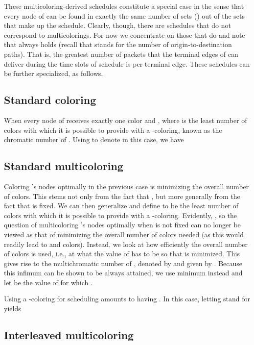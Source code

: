 \documentclass{article}
\begin{document}
These multicoloring-derived schedules constitute a special case in the sense
that every node of  can be found in exactly the same number of sets () out
of the  sets that make up the schedule. Clearly, though, there are schedules
that do not correspond to multicolorings. For now we concentrate on those that
do and note that  always holds (recall
that  stands for the number of origin-to-destination paths). That is,
the greatest number of packets that the  terminal edges of  can deliver
during the  time slots of schedule  is  per terminal edge.
These schedules can be further specialized, as follows.

\subsection{Standard coloring}

When  every node of  receives exactly one color and
, where  is the least number
of colors with which it is possible to provide  with a -coloring, known as
the chromatic number of . Using  to denote 
in this case, we have


\subsection{Standard multicoloring}

Coloring 's nodes optimally in the previous case is minimizing the overall
number of colors. This stems not only from the fact that , but more
generally from the fact that  is fixed. We can then generalize and define
 to be the least number of colors with which it is possible to
provide  with a -coloring. Evidently,
, so the question of multicoloring 's
nodes optimally when  is not fixed can no longer be viewed as that of
minimizing the overall number of colors needed (as this would readily lead to
 and  colors). Instead, we look at how efficiently the overall
number of colors is used, i.e., at what the value of  has to be so that
 is minimized. This gives rise to the multichromatic number of ,
denoted by  and given by .
Because this infimum can be shown to be always attained, we use minimum instead
and let  be the value of  for which .

Using a -coloring for scheduling amounts to having
. In this case, letting
 stand for  yields


\subsection{Interleaved multicoloring}
\end{document}
